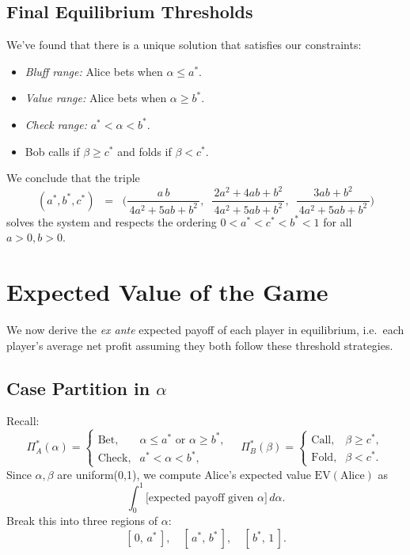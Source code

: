 \documentclass{article}
\begin{document}
\subsection{Final Equilibrium Thresholds}

We've found that there is a unique solution that satisfies our constraints:
\begin{itemize}
    \item \emph{Bluff range:} Alice bets when $\alpha \le a^*$.
    \item \emph{Value range:} Alice bets when $\alpha \ge b^*$.
    \item \emph{Check range:} $a^* < \alpha < b^*$.
    \item Bob calls if $\beta \ge c^*$ and folds if $\beta < c^*$.
\end{itemize}

\noindent
We conclude that the triple
\[
(a^*,b^*,c^*) 
\;\;=\;\;
\biggl(
\frac{\,a\,b\,}{\,4a^2 +5ab + b^2\,},
\;\;
\frac{\,2a^2 +4ab + b^2\,}{\,4a^2 +5ab + b^2\,},
\;\;
\frac{\,3ab + b^2\,}{\,4a^2 +5ab + b^2\,}
\biggr)
\]
solves the system and respects the ordering $0 < a^* < c^* < b^* < 1$ for all $a>0,b>0$.  


\section{Expected Value of the Game}

We now derive the \emph{ex ante} expected payoff of each player in equilibrium, i.e.\ each player's average net profit assuming they both follow these threshold strategies. 

\subsection{Case Partition in \texorpdfstring{$\alpha$}{alpha}}

Recall:
\[
\Pi_A^*(\alpha)
=\begin{cases}
\text{Bet}, & \alpha \le a^* \text{ or } \alpha \ge b^*,\\
\text{Check}, & a^*<\alpha<b^*,
\end{cases}
\quad
\Pi_B^*(\beta)
=\begin{cases}
\text{Call}, & \beta \ge c^*,\\
\text{Fold}, & \beta < c^*.
\end{cases}
\]
Since $\alpha,\beta$ are uniform(0,1), we compute Alice's expected value $\mathrm{EV}(\text{Alice})$ as
\[
\int_0^1 \bigl[\text{expected payoff given }\alpha\bigr] \,d\alpha.
\]
Break this into three regions of $\alpha$: 
\[
[\,0,\,a^*\,],\quad
[\,a^*,\,b^*\,],\quad
[\,b^*,\,1\,].
\]
\end{document}
